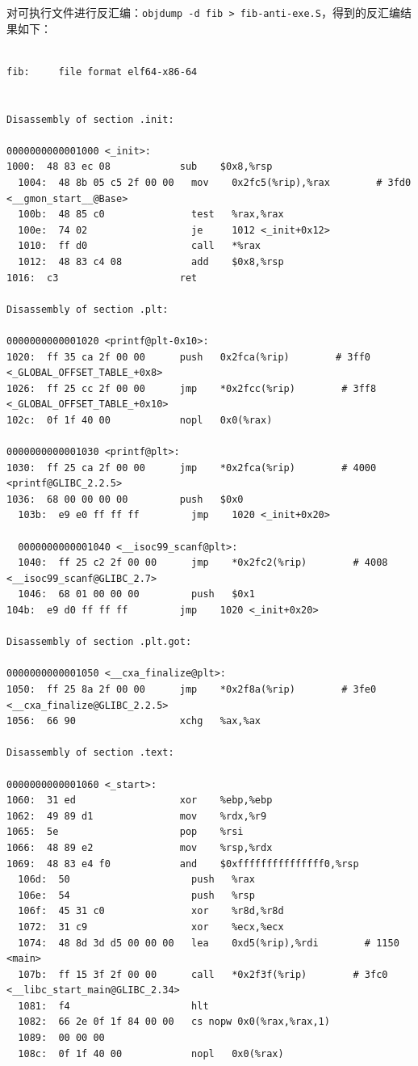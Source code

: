 \documentclass[UTF8,a4paper,10pt]{ctexart}
\begin{document}
对可执行文件进行反汇编：\verb|objdump -d fib > fib-anti-exe.S|，得到的反汇编结果如下：

\begin{verbatim}

fib:     file format elf64-x86-64


Disassembly of section .init:

0000000000001000 <_init>:
1000:  48 83 ec 08            sub    $0x8,%rsp
  1004:  48 8b 05 c5 2f 00 00   mov    0x2fc5(%rip),%rax        # 3fd0 <__gmon_start__@Base>
  100b:  48 85 c0               test   %rax,%rax
  100e:  74 02                  je     1012 <_init+0x12>
  1010:  ff d0                  call   *%rax
  1012:  48 83 c4 08            add    $0x8,%rsp
1016:  c3                     ret

Disassembly of section .plt:

0000000000001020 <printf@plt-0x10>:
1020:  ff 35 ca 2f 00 00      push   0x2fca(%rip)        # 3ff0 <_GLOBAL_OFFSET_TABLE_+0x8>
1026:  ff 25 cc 2f 00 00      jmp    *0x2fcc(%rip)        # 3ff8 <_GLOBAL_OFFSET_TABLE_+0x10>
102c:  0f 1f 40 00            nopl   0x0(%rax)

0000000000001030 <printf@plt>:
1030:  ff 25 ca 2f 00 00      jmp    *0x2fca(%rip)        # 4000 <printf@GLIBC_2.2.5>
1036:  68 00 00 00 00         push   $0x0
  103b:  e9 e0 ff ff ff         jmp    1020 <_init+0x20>

  0000000000001040 <__isoc99_scanf@plt>:
  1040:  ff 25 c2 2f 00 00      jmp    *0x2fc2(%rip)        # 4008 <__isoc99_scanf@GLIBC_2.7>
  1046:  68 01 00 00 00         push   $0x1
104b:  e9 d0 ff ff ff         jmp    1020 <_init+0x20>

Disassembly of section .plt.got:

0000000000001050 <__cxa_finalize@plt>:
1050:  ff 25 8a 2f 00 00      jmp    *0x2f8a(%rip)        # 3fe0 <__cxa_finalize@GLIBC_2.2.5>
1056:  66 90                  xchg   %ax,%ax

Disassembly of section .text:

0000000000001060 <_start>:
1060:  31 ed                  xor    %ebp,%ebp
1062:  49 89 d1               mov    %rdx,%r9
1065:  5e                     pop    %rsi
1066:  48 89 e2               mov    %rsp,%rdx
1069:  48 83 e4 f0            and    $0xfffffffffffffff0,%rsp
  106d:  50                     push   %rax
  106e:  54                     push   %rsp
  106f:  45 31 c0               xor    %r8d,%r8d
  1072:  31 c9                  xor    %ecx,%ecx
  1074:  48 8d 3d d5 00 00 00   lea    0xd5(%rip),%rdi        # 1150 <main>
  107b:  ff 15 3f 2f 00 00      call   *0x2f3f(%rip)        # 3fc0 <__libc_start_main@GLIBC_2.34>
  1081:  f4                     hlt
  1082:  66 2e 0f 1f 84 00 00   cs nopw 0x0(%rax,%rax,1)
  1089:  00 00 00
  108c:  0f 1f 40 00            nopl   0x0(%rax)


\end{verbatim}
\end{document}
